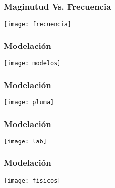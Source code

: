 \documentclass{beamer}
\begin{document}
\begin{frame}
\frametitle{Maginutud Vs. Frecuencia}
\begin{center}
\texttt{[image: frecuencia]}
\end{center}
\end{frame}
\begin{frame}
\frametitle{Modelación}
\begin{center}
\texttt{[image: modelos]}
\end{center}
\end{frame}
\begin{frame}
\frametitle{Modelación}
\begin{center}
\texttt{[image: pluma]}
\end{center}
\end{frame}
\begin{frame}
\frametitle{Modelación}
\begin{center}
\texttt{[image: lab]}
\end{center}
\end{frame}
\begin{frame}
\frametitle{Modelación}
\begin{center}
\texttt{[image: fisicos]}
\end{center}
\end{frame}
\end{document}
